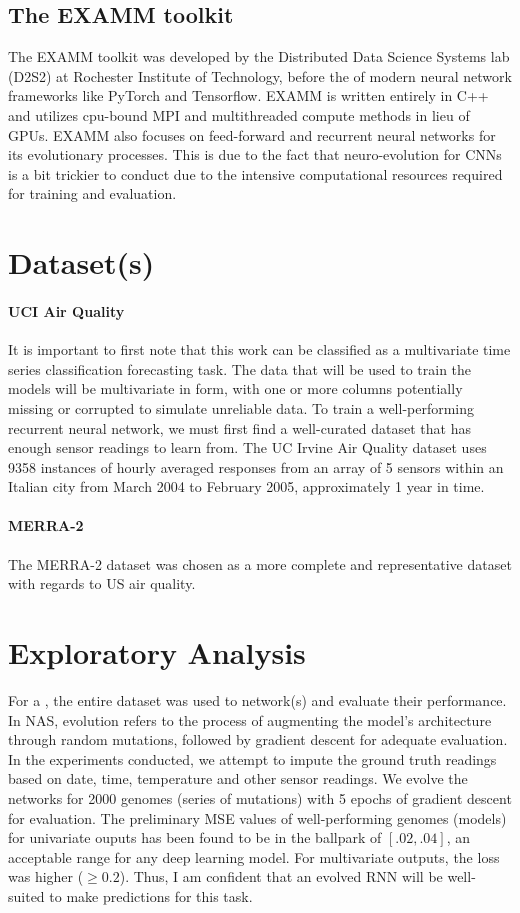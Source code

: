 \documentclass[12pt]{article}
\begin{document}
\subsection{The EXAMM toolkit}
The EXAMM toolkit was developed by the Distributed Data Science Systems lab (D2S2) at Rochester Institute of Technology, before the  of modern neural network frameworks like PyTorch and Tensorflow. EXAMM is written entirely in C++ and utilizes cpu-bound MPI and multithreaded compute methods in lieu of GPUs. EXAMM also focuses on feed-forward and recurrent neural networks for its evolutionary processes. This is due to the fact that neuro-evolution for CNNs is a bit trickier to conduct due to the intensive computational resources required for training and evaluation.

\section{Dataset(s)}
\paragraph{UCI Air Quality}
It is important to first note that this work can be classified as a multivariate time series classification forecasting task. The data that will be used to train the models will be multivariate in form, with one or more columns potentially missing or corrupted to simulate unreliable data.
To train a well-performing recurrent neural network, we must first find a well-curated dataset that has enough sensor readings to learn from. The UC Irvine Air Quality dataset \cite{misc_air_quality_360} uses 9358 instances of hourly averaged responses from an array of 5 sensors within an Italian city from March 2004 to February 2005, approximately 1 year in time.
\paragraph{MERRA-2}
The MERRA-2 dataset was chosen as a more complete and representative dataset with regards to US air quality.

\section{Exploratory Analysis}
For a , the entire dataset was used to  network(s) and evaluate their performance. In NAS, evolution refers to the process of augmenting the model's architecture through random mutations, followed by gradient descent for adequate evaluation. In the experiments conducted, we attempt to impute the ground truth readings based on date, time, temperature and other sensor readings. We evolve the networks for 2000 genomes (series of mutations) with 5 epochs of gradient descent for evaluation. The preliminary MSE values of well-performing genomes (models) for univariate ouputs has been found to be in the ballpark of $[.02,.04]$, an acceptable range for any deep learning model. For multivariate outputs, the loss was higher ($\geq 0.2$). Thus, I am confident that an evolved RNN will be well-suited to make predictions for this task. 
\end{document}
